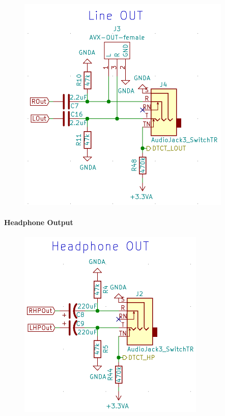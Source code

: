 \begin{figure} [H]
\begin{center}
 \includegraphics[scale=0.5]{../graphics/Schema_LineOUT.png}
\caption{}
\label{fig:Schema_LineOUT}
\end{center}
\end{figure}


\paragraph{Headphone Output}
\label{par:HPOUT}


\begin{figure} [H]
\begin{center}
 \includegraphics[scale=0.5]{../graphics/Schema_HPOUT.png}\caption{}
\label{fig:Schema_HPOUT}
\end{center}
\end{figure}





